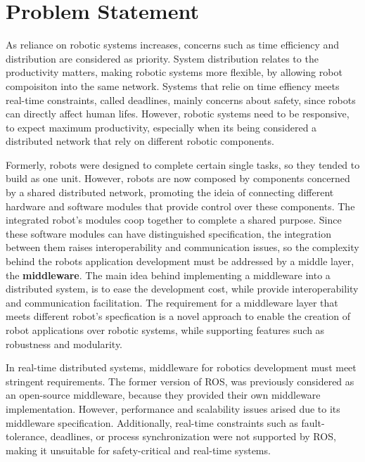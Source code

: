 \section{Problem Statement}\label{s:problem}

As reliance on robotic systems increases,  
concerns such as time efficiency and distribution are considered as priority. %
System distribution relates to the productivity matters, making robotic systems more flexible, by allowing robot compoisiton into the same network. Systems that relie on time effiency meets real-time constraints, called deadlines, mainly concerns about safety, since robots can directly affect human lifes. However, robotic systems need to be responsive, to expect maximum productivity, especially when its being considered a distributed network that rely on different robotic components. 

Formerly, robots were designed to complete certain single tasks, so they tended to build as one unit. However, robots are now composed by components concerned by a shared distributed network, promoting the ideia of connecting different hardware and software modules that provide control over these components. The integrated robot's modules coop together to complete a shared purpose. Since these software modules can have distinguished specification, the integration between them raises interoperability and communication issues, so the complexity behind the robots application development must be addressed by a middle layer, the \textbf{middleware}. The main idea behind implementing a middleware into a distributed system, is to ease the development cost, while provide interoperability and communication facilitation.\cite{mohamed2008middleware} The requirement for a middleware layer that meets different robot's specfication is a novel approach to enable the creation of robot applications over robotic systems, while supporting features such as robustness and modularity. 

In real-time distributed systems, middleware for robotics development must meet stringent requirements.\cite{maruyama2016exploring} The former version of ROS, was previously considered as an open-source middleware, because they provided their own middleware implementation. However, performance and scalability issues arised due to its middleware specification.\cite{intro-ros} Additionally, real-time constraints such as fault-tolerance, deadlines, or process synchronization were not supported by ROS, making it unsuitable for safety-critical and real-time systems.\cite{kim2018security} 

